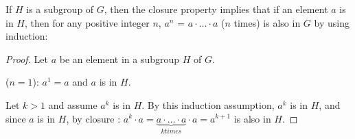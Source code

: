 \begin{boxedRemark} \label{rem:induction-closure}
    If $H$ is a subgroup of $G$, then the closure property implies that if an element $a$ is in $H$, then for any positive integer $n$, $a^n$ = $a \cdot \hdots \cdot a$ ($n$ times) is also in $G$ by using induction: 
\end{boxedRemark}
\begin{proof}
    Let $a$ be an element in a subgroup $H$ of $G$. 

    ($n = 1$): $a^1 = a$ and $a$ is in $H$. 

    Let $k > 1$ and assume $a^k$ is in $H$. By this induction assumption, $a^k$ is in $H$, and since $a$ is in $H$, by closure : $a^k \cdot a = \underbrace{a \cdot \hdots \cdot a}_{k times}\cdot a = a^{k+1}$ is also in $H$.
\end{proof}

